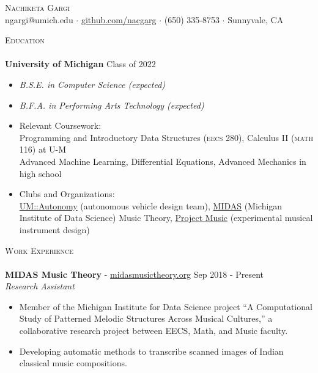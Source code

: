\documentclass[11pt]{extarticle}
\newcommand{\lineunder} {
	\vspace*{-8pt} \\
	\hspace*{-18pt} \hrulefill \\
}
\newcommand{\header} [1] {
	{\hspace*{-18pt}\vspace*{6pt} \textsc{#1}}
	\vspace*{-6pt} \lineunder
}
\begin{document}
\vspace*{-30pt}
	

\begin{center}
	{\Huge \scshape {Nachiketa Gargi}}\\
	ngargi@umich.edu $\cdot$ \url{github.com/nacgarg} $\cdot$ (650) 335-8753 $\cdot$ Sunnyvale, CA \\
\end{center}
\noindent
\header{Education}
\noindent
\textbf{University of Michigan} \hfill Class of 2022
\vspace{-2mm}
\begin{itemize}
	\setlength{\itemindent}{-3mm}
	\item[] \textit{B.S.E. in Computer Science (expected)}\vspace{-3mm}
	\item[] \textit{B.F.A. in Performing Arts Technology (expected)}
	\item[] Relevant Coursework: \\ Programming and Introductory Data Structures (\textsc{eecs 280}), Calculus II (\textsc{math 116}) at U-M \\ Advanced Machine Learning, Differential Equations, Advanced Mechanics in high school
	\item[] Clubs and Organizations:\\ \href{https://umautonomy.com/}{UM::Autonomy} (autonomous vehicle design team), \href{http://www.midasmusictheory.org/}{MIDAS} (Michigan Institute of Data Science) Music Theory, \href{https://michiganprojectmusic.github.io/index.html}{Project Music} (experimental musical instrument design) 
\end{itemize}

\noindent
\header{Work Experience}
\noindent
\textbf{MIDAS Music Theory} - \url{midasmusictheory.org} \hfill Sep 2018 - Present\\
\textit{Research Assistant} \\ 
\vspace{-6mm}
\begin{itemize} \itemsep 0.1pt
	\item Member of the Michigan Institute for Data Science project “A Computational Study of Patterned Melodic Structures Across Musical Cultures,” a collaborative research project between EECS, Math, and Music faculty.
	\item Developing automatic methods to transcribe scanned images of Indian classical music compositions.
\end{itemize}
\end{document}
